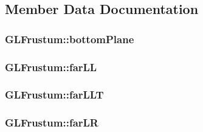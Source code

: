 \subsection{Member Data Documentation}
\hypertarget{class_g_l_frustum_a84e904240e3eb380e05eed216cc07860}{
\subsubsection[{bottom\-Plane}]{ G\-L\-Frustum\-::bottom\-Plane\hspace{0.3cm}{\ttfamily [protected]}}}\label{class_g_l_frustum_a84e904240e3eb380e05eed216cc07860}
\hypertarget{class_g_l_frustum_ac2322ee21830b8d7aac70e05dc24660b}{
\subsubsection[{far\-L\-L}]{ G\-L\-Frustum\-::far\-L\-L\hspace{0.3cm}{\ttfamily [protected]}}}\label{class_g_l_frustum_ac2322ee21830b8d7aac70e05dc24660b}
\hypertarget{class_g_l_frustum_ae533d94efe71285959db7e5152492b64}{
\subsubsection[{far\-L\-L\-T}]{ G\-L\-Frustum\-::far\-L\-L\-T\hspace{0.3cm}{\ttfamily [protected]}}}\label{class_g_l_frustum_ae533d94efe71285959db7e5152492b64}
\hypertarget{class_g_l_frustum_a7484d94df8694846ce1491e2d2388acc}{
\subsubsection[{far\-L\-R}]{ G\-L\-Frustum\-::far\-L\-R\hspace{0.3cm}{\ttfamily [protected]}}}\label{class_g_l_frustum_a7484d94df8694846ce1491e2d2388acc}
